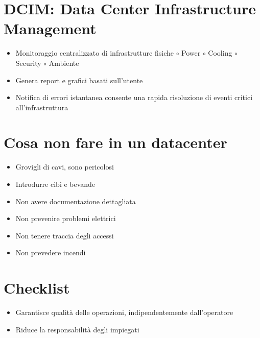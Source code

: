\documentclass[a4paper, 12pt]{report}
\begin{document}
          \section{DCIM: Data Center Infrastructure Management}
          \begin{itemize}
            \item Monitoraggio centralizzato di infrastrutture fisiche
            \subitem $\circ$ Power 
            \subitem $\circ$ Cooling 
            \subitem $\circ$ Security 
            \subitem $\circ$ Ambiente 
            \item Genera report e grafici basati sull'utente
            \item Notifica di errori istantanea consente una rapida risoluzione di eventi critici all'infrastruttura
          \end{itemize}
          \section{Cosa non fare in un datacenter}
          \begin{itemize}
            \item Grovigli di cavi, sono pericolosi
            \item Introdurre cibi e bevande
            \item Non avere documentazione dettagliata
            \item Non prevenire problemi elettrici
            \item Non tenere traccia degli accessi
            \item Non prevedere incendi
          \end{itemize}
          \section{Checklist}
          \begin{itemize}
            \item Garantisce qualità delle operazioni, indipendentemente dall'operatore
            \item Riduce la responsabilità degli impiegati
          \end{itemize}
\end{document}
